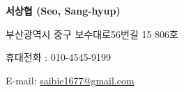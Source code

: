 \documentclass[11pt]{article} %
\begin{document}
\newcommand\profile{
	{\LARGE\bfseries 서상협 (Seo, Sang-hyup)} %
	\bigskip\bigskip\medskip %
	
	부산광역시 중구 보수대로56번길 15 806호 %
	\medskip %
	
	휴대전화 : 010-4545-9199 %
	\medskip %
	
	E-mail: \href{mailto:saibie1677@gmail.com}{saibie1677@gmail.com}\\ %
}

\newcommand\profileeng{
	{\LARGE\bfseries Seo, Sang-hyup (서상협)} %
	\bigskip\bigskip\medskip %
	
	48973, No.806, 15, Bosu-daero 56beon-gil, Jung-gu, Busan, Republic of Korea %
	\medskip %
	
	Mobile : 010-4545-9199 %
	\medskip %
	
	E-mail: \href{mailto:saibie1677@gmail.com}{saibie1677@gmail.com}\\ %
}





%

\profile

%
\end{document}
